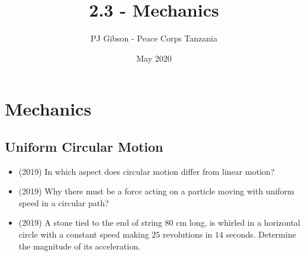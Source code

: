 \documentclass{article}
\title{2.3 - Mechanics}
\author{PJ Gibson - Peace Corps Tanzania}
\date{May 2020}
\begin{document}
\maketitle


\section{Mechanics}

\subsection{Uniform Circular Motion}
\begin{itemize}
\item (2019)  In which aspect does circular motion differ from linear motion? 
\item (2019)  Why there must be a force acting on a particle moving with uniform speed in a circular path? 
\item (2019)  A stone tied to the end of string $ 80$ cm long, is whirled in a horizontal circle with a constant speed making $ 25$ revolutions in $ 14$ seconds. Determine the magnitude of its acceleration. 
\end{itemize}
\end{document}
